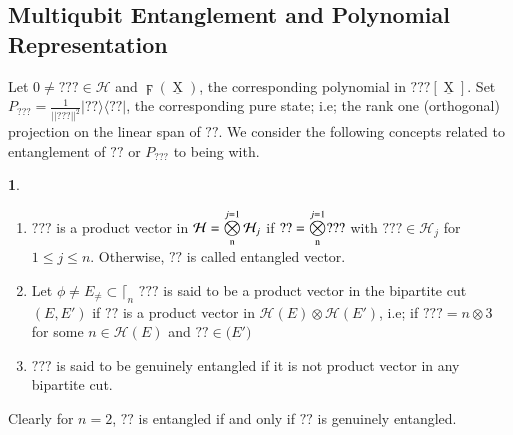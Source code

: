 \documentclass[a4paper,12pt]{article}
\DeclareMathOperator{\x}{\mathrm{X}}
\theoremstyle{definition}
\theoremstyle{underlinethm}
\theoremstyle{underline}
\newtheorem{subsubsec}{}[subsection]
\begin{document}
 
 \subsection{Multiqubit Entanglement and Polynomial Representation}\label{subsection-2.2}
 
 Let $0 \neq ???  \in \mathcal{H}$ and $\digamma (\underline{\x})$, the corresponding polynomial in $???[\underline{\x}]$. Set $P_{???} = \frac{1}{|| ???||^{2}} | ??\rangle \langle??|$, the corresponding pure state; i.e; the rank one (orthogonal) projection on the linear span of $??$. We consider the following concepts related to entanglement of $??$ or $P_{???}$ to being with. 
 
 
 \begin{subsubsec}\label{subsubsection-2.2.1}
 
 \begin{enumerate}[label=(\alph*)]
 \item $???$ is a product vector in $\mathcal{H} = \bigotimes\limits_{\rm n}^{j=1} \mathcal{H}_{j}$ if $?? =\bigotimes\limits_{\rm n}^{j = 1} ???$ with $??? \in \mathcal{H}_{j}$ for $1 \leq j \leq n$. Otherwise, $??$ is called entangled vector.
   
 \item Let $\phi \neq E_{\neq} \subset \lceil_{n}$ $???$ is said to be a product vector in the bipartite cut $(E, E')$ if $??$ is a product vector in $\mathcal{H}(E)\otimes \mathcal{H}(E')$, i.e; if $??? = n \otimes 3$ for some $n \in \mathcal{H}(E)$ and $?? \in \mathcal(E')$
 
 \item $???$ is said to be genuinely entangled if it is not product vector in any bipartite cut.
  
 \end{enumerate}
 
 Clearly for $n = 2$, $??$ is entangled if and only if $??$ is genuinely entangled.
 
 \end{subsubsec}
 
 
\end{document}
